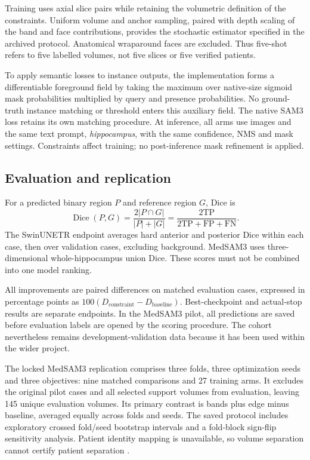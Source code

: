 Training uses axial slice pairs while retaining the volumetric definition of the constraints. Uniform volume and anchor sampling, paired with depth scaling of the band and face contributions, provides the stochastic estimator specified in the archived protocol. Anatomical wraparound faces are excluded. Thus five-shot refers to five labelled volumes, not five slices or five verified patients.

To apply semantic losses to instance outputs, the implementation forms a differentiable foreground field by taking the maximum over native-size sigmoid mask probabilities multiplied by query and presence probabilities. No ground-truth instance matching or threshold enters this auxiliary field. The native SAM3 loss retains its own matching procedure. At inference, all arms use images and the same text prompt, \emph{hippocampus}, with the same confidence, NMS and mask settings. Constraints affect training; no post-inference mask refinement is applied.

\subsection{Evaluation and replication}
For a predicted binary region $P$ and reference region $G$, Dice is
\begin{equation}
\operatorname{Dice}(P,G)=\frac{2|P\cap G|}{|P|+|G|}
=\frac{2\mathrm{TP}}{2\mathrm{TP}+\mathrm{FP}+\mathrm{FN}}.
\end{equation}
The SwinUNETR endpoint averages hard anterior and posterior Dice within each case, then over validation cases, excluding background. MedSAM3 uses three-dimensional whole-hippocampus union Dice. These scores must not be combined into one model ranking.

All improvements are paired differences on matched evaluation cases, expressed in percentage points as $100(D_{\mathrm{constraint}}-D_{\mathrm{baseline}})$. Best-checkpoint and actual-stop results are separate endpoints. In the MedSAM3 pilot, all predictions are saved before evaluation labels are opened by the scoring procedure. The cohort nevertheless remains development-validation data because it has been used within the wider project.

The locked MedSAM3 replication comprises three folds, three optimization seeds and three objectives: nine matched comparisons and 27 training arms. It excludes the original pilot cases and all selected support volumes from evaluation, leaving 145 unique evaluation volumes. Its primary contrast is bands plus edge minus baseline, averaged equally across folds and seeds. The saved protocol includes exploratory crossed fold/seed bootstrap intervals and a fold-block sign-flip sensitivity analysis. Patient identity mapping is unavailable, so volume separation cannot certify patient separation \cite{localMedSAMreplication}.
